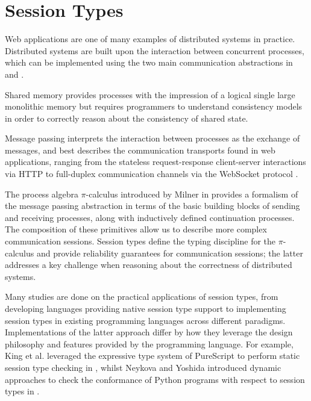 \section{Session Types}

Web applications are one of many examples of distributed systems in practice. Distributed systems are built upon the interaction between concurrent processes, which can be implemented using the two main communication abstractions in  and . 

Shared memory provides processes with the impression of a logical single large monolithic memory but requires programmers to understand consistency models in order to correctly reason about the consistency of shared state.

Message passing interprets the interaction between processes as the exchange of messages, and best describes the communication transports found in web applications, ranging from the stateless request-response client-server interactions via HTTP to full-duplex communication channels via the WebSocket protocol \cite{WebSocketRFC}.

The process algebra $\pi$-calculus introduced by Milner in \cite{Milner1999} provides a formalism of the message passing abstraction in terms of the basic building blocks of sending and receiving processes, along with inductively defined continuation processes. The composition of these primitives allow us to describe more complex communication sessions.
Session types define the typing discipline for the $\pi$-calculus and provide reliability guarantees for communication sessions; the latter addresses a key challenge when reasoning about the correctness of distributed systems. 

Many studies are done on the practical applications of session types, from developing languages providing native session type support \cite{ATS2016} to implementing session types in existing programming languages across different paradigms.
Implementations of the latter approach differ by how they leverage the design philosophy and features provided by the programming language. For example, King et al. leveraged the expressive type system of PureScript to perform static session type checking in \cite{PureScript2019}, whilst Neykova and Yoshida introduced dynamic approaches to check the conformance of Python programs with respect to session types in \cite{Python2017}.

